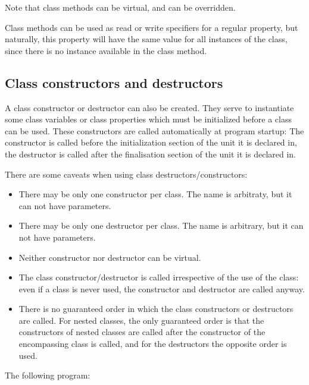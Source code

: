 Note that class methods can be virtual, and can be overridden.

Class methods can be used as read or write specifiers for a regular property, 
but naturally, this property will have the same value for all instances of the
class, since there is no instance available in the class method.

\subsection{Class constructors and destructors}
A class constructor or destructor can also be created. They serve to instantiate some class variables or class properties which must be initialized before a class can be used.
These constructors are called automatically at program startup: The constructor is called before the initialization section of the unit it is declared in, the destructor is 
called after the finalisation section of the unit it is declared in. 

There are some caveats when using class destructors/constructors:
\begin{itemize}
\item There may be only one constructor per class. The name is arbitraty, but it can not have parameters.
\item There may be only one destructor per class. The name is arbitrary, but it can not have parameters.
\item Neither constructor nor destructor can be virtual.
\item The class constructor/destructor is called irrespective of the use of the class: even if a class is never used, the constructor and destructor are called anyway.
\item There is no guaranteed order in which the class constructors or destructors are called. 
For nested classes, the only guaranteed order is that the constructors of
nested classes are called after the constructor of the encompassing class is
called, and for the destructors the opposite order is used.
\end{itemize}
 
The following program:

